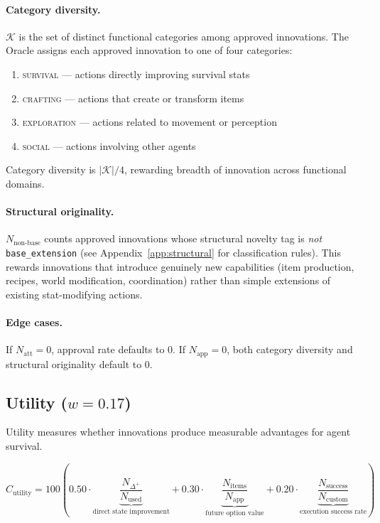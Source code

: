 \documentclass[a4paper, 11pt]{article}
\newcommand{\Natt}{N_{\text{att}}}
\newcommand{\Napp}{N_{\text{app}}}
\newcommand{\Nused}{N_{\text{used}}}
\newcommand{\Ncustom}{N_{\text{custom}}}
\newcommand{\Nsuccess}{N_{\text{success}}}
\begin{document}
\paragraph{Category diversity.} $\mathcal{K}$ is the set of distinct functional categories among approved innovations. The Oracle assigns each approved innovation to one of four categories:

\begin{enumerate}[nosep]
    \item \textsc{survival} --- actions directly improving survival stats
    \item \textsc{crafting} --- actions that create or transform items
    \item \textsc{exploration} --- actions related to movement or perception
    \item \textsc{social} --- actions involving other agents
\end{enumerate}

Category diversity is $|\mathcal{K}| / 4$, rewarding breadth of innovation across functional domains.

\paragraph{Structural originality.} $N_{\text{non-base}}$ counts approved innovations whose structural novelty tag is \emph{not} \texttt{base\_extension} (see Appendix~\ref{app:structural} for classification rules). This rewards innovations that introduce genuinely new capabilities (item production, recipes, world modification, coordination) rather than simple extensions of existing stat-modifying actions.

\paragraph{Edge cases.} If $\Natt = 0$, approval rate defaults to $0$. If $\Napp = 0$, both category diversity and structural originality default to $0$.

\subsection{Utility ($w = 0.17$)}

Utility measures whether innovations produce measurable advantages for agent survival.

\begin{equation}
C_{\text{utility}} = 100 \left(
    0.50 \cdot \underbrace{\frac{N_{\Delta^+}}{\Nused}}_{\text{direct state improvement}}
    + 0.30 \cdot \underbrace{\frac{N_{\text{items}}}{\Napp}}_{\text{future option value}}
    + 0.20 \cdot \underbrace{\frac{\Nsuccess}{\Ncustom}}_{\text{execution success rate}}
\right)
\label{eq:utility}
\end{equation}
\end{document}
